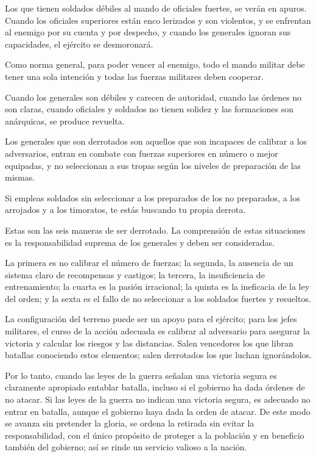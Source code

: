 Los que tienen soldados débiles al mando de oficiales fuertes, se verán en apuros. Cuando los oficiales superiores están enco lerizados y son violentos, y se enfrentan al enemigo por su cuenta y por despecho, y cuando los generales ignoran sus capacidades, el ejército se desmoronará.

Como norma general, para poder vencer al enemigo, todo el mando militar debe tener una sola intención y todas las fuerzas militares deben cooperar.

Cuando los generales son débiles y carecen de autoridad, cuando las órdenes no son claras, cuando oficiales y soldados no tienen solidez y las formaciones son anárquicas, se produce revuelta.

Los generales que son derrotados son aquellos que son incapaces de calibrar a los adversarios, entran en combate con fuerzas superiores en número o mejor equipadas, y no seleccionan a sus tropas según los niveles de preparación de las mismas.

Si empleas soldados sin seleccionar a los preparados de los no preparados, a los arrojados y a los timoratos, te estás buscando tu propia derrota.

Estas son las seis maneras de ser derrotado. La comprensión de estas situaciones es la responsabilidad suprema de los generales y deben ser consideradas.

La primera es no calibrar el número de fuerzas; la segunda, la ausencia de un sistema claro de recompensas y castigos; la tercera, la insuficiencia de entrenamiento; la cuarta es la pasión irracional; la quinta es la ineficacia de la ley del orden; y la sexta es el fallo de no seleccionar a los soldados fuertes y resueltos.

La configuración del terreno puede ser un apoyo para el ejército; para los jefes militares, el curso de la acción adecuada es calibrar al adversario para asegurar la victoria y calcular los riesgos y las distancias. Salen vencedores los que libran batallas conociendo estos elementos; salen derrotados los que luchan ignorándolos.

Por lo tanto, cuando las leyes de la guerra señalan una victoria segura es claramente apropiado entablar batalla, incluso si el gobierno ha dada órdenes de no atacar. Si las leyes de la guerra no indican una victoria segura, es adecuado no entrar en batalla, aunque el gobierno haya dada la orden de atacar. De este modo se avanza sin pretender la gloria, se ordena la retirada sin evitar la responsabilidad, con el único propósito de proteger a la población y en beneficio también del gobierno; así se rinde un servicio valioso a la nación.

